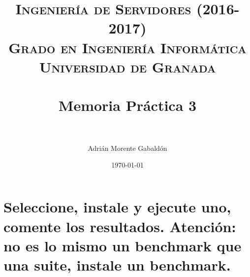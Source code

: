 


\title{
\normalfont \normalsize
\textsc{\textbf{Ingeniería de Servidores (2016-2017)} \\ Grado en Ingeniería Informática \\ Universidad de Granada} \\ [25pt] %
\horrule{0.5pt} \\[0.4cm] %
\huge Memoria Práctica 3 \\ %
\horrule{2pt} \\[0.5cm] %
}

\author{Adrián Morente Gabaldón} %

\date{\normalsize\today} %




\maketitle %

\newpage %

\tableofcontents %

\newpage

\listoffigures

\listoftables

\newpage


\section{Seleccione, instale y ejecute uno, comente los resultados. \textbf{Atención}: no es lo mismo un benchmark que una suite, instale un benchmark.}


